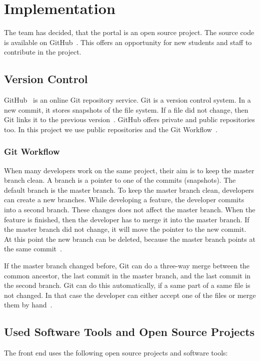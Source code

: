 \chapter{Implementation}\label{implementation}

The team has decided, that the portal is an open source project. The source code is available on GitHub~\cite{Github-final}. This offers an opportunity for new students and staff to contribute in the project.

\section{Version Control}
GitHub~\cite{github} is an online Git repository service. Git is a version control system. In a new commit, it stores snapshots of the file system. If a file did not change, then Git links it to the previous version~\cite{git}. GitHub offers private and public repositories too. In this project we use public repositories and the Git Workflow~\cite{git-workflow}. 

\subsection{Git Workflow}
When many developers work on the same project, their aim is to keep the master branch clean. A branch is a pointer to one of the commits (snapshots). The default branch is the master branch. To keep the master branch clean, developers can create a new branches. While developing a feature, the developer commits into a second branch. These changes does not affect the master branch. When the feature is finished, then the developer has to merge it into the master branch. If the master branch did not change, it will move the pointer to the new commit. At this point the new branch can be deleted, because the master branch points at the same commit~\cite{git-workflow2}.

If the master branch changed before, Git can do a three-way merge between the common ancestor, the last commit in the master branch, and the last commit in the second branch. Git can do this automatically, if a same part of a same file is not changed. In that case the developer can either accept one of the files or merge them by hand~\cite{git-workflow2}.

\section{Used Software Tools and Open Source Projects}
The front end uses the following open source projects and software tools:

